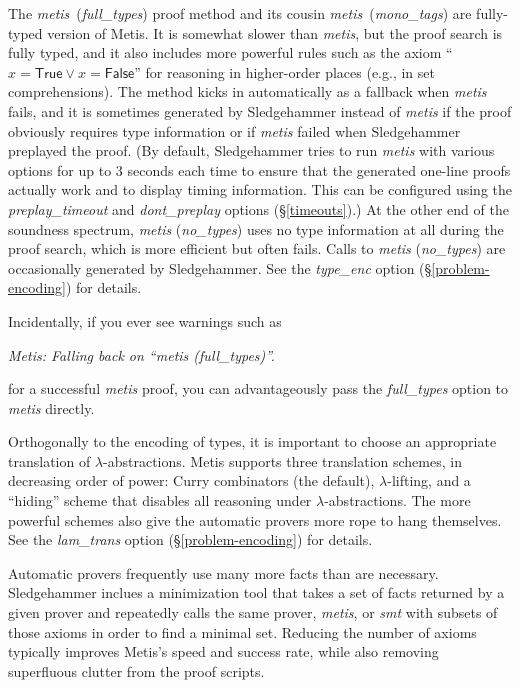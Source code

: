 \documentclass[a4paper,12pt]{article}
\newcommand\const[1]{\textsf{#1}}
\begin{document}
The \textit{metis}~(\textit{full\_types}) proof method
and its cousin \textit{metis}~(\textit{mono\_tags}) are fully-typed
version of Metis. It is somewhat slower than \textit{metis}, but the proof
search is fully typed, and it also includes more powerful rules such as the
axiom ``$x = \const{True} \mathrel{\lor} x = \const{False}$'' for reasoning in
higher-order places (e.g., in set comprehensions). The method kicks in
automatically as a fallback when \textit{metis} fails, and it is sometimes
generated by Sledgehammer instead of \textit{metis} if the proof obviously
requires type information or if \textit{metis} failed when Sledgehammer
preplayed the proof. (By default, Sledgehammer tries to run \textit{metis} with
various options for up to 3 seconds each time to ensure that the generated
one-line proofs actually work and to display timing information. This can be
configured using the \textit{preplay\_timeout} and \textit{dont\_preplay}
options (\S\ref{timeouts}).)
%
At the other end of the soundness spectrum, \textit{metis} (\textit{no\_types})
uses no type information at all during the proof search, which is more efficient
but often fails. Calls to \textit{metis} (\textit{no\_types}) are occasionally
generated by Sledgehammer.
%
See the \textit{type\_enc} option (\S\ref{problem-encoding}) for details.

Incidentally, if you ever see warnings such as

\prew
\slshape
Metis: Falling back on ``\textit{metis} (\textit{full\_types})''.
\postw

for a successful \textit{metis} proof, you can advantageously pass the
\textit{full\_types} option to \textit{metis} directly.


Orthogonally to the encoding of types, it is important to choose an appropriate
translation of $\lambda$-abstractions. Metis supports three translation schemes,
in decreasing order of power: Curry combinators (the default),
$\lambda$-lifting, and a ``hiding'' scheme that disables all reasoning under
$\lambda$-abstractions. The more powerful schemes also give the automatic
provers more rope to hang themselves. See the \textit{lam\_trans} option (\S\ref{problem-encoding}) for details.


Automatic provers frequently use many more facts than are necessary.
Sledgehammer inclues a minimization tool that takes a set of facts returned by a
given prover and repeatedly calls the same prover, \textit{metis}, or
\textit{smt} with subsets of those axioms in order to find a minimal set.
Reducing the number of axioms typically improves Metis's speed and success rate,
while also removing superfluous clutter from the proof scripts.
\end{document}
